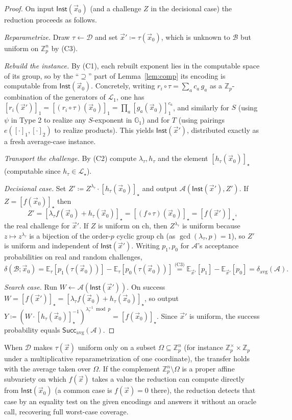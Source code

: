 \documentclass{aicr-solution}
\newcommand{\Gone}{\mathbb{G}_1}
\newcommand{\Zp}{\mathbb{Z}_p}
\newcommand{\Zpx}{\mathbb{Z}_p^{\times}}
\newcommand{\vx}{\vec{x}}
\newcommand{\Inst}{\mathsf{Inst}}
\newcommand{\Succ}{\mathsf{Succ}}
\newcommand{\Ex}{\mathbb{E}}
\newcommand{\LL}{\mathcal{L}}
\newcommand{\ch}{\mathrm{ch}}
\begin{document}
\begin{proof}
On input $\Inst(\vx_0)$ (and a challenge $Z$ in the decisional case) the reduction proceeds
as follows.

\emph{Reparametrize.} Draw $\tau\leftarrow\mathcal D$ and set $\vx'\coloneqq\tau(\vx_0)$,
which is unknown to $\mathcal B$ but uniform on $\Zp^{n}$ by (C3).

\emph{Rebuild the instance.} By (C1), each rebuilt exponent lies in the computable space of
its group, so by the ``$\supseteq$'' part of Lemma~\ref{lem:comp} its encoding is
computable from $\Inst(\vx_0)$. Concretely, writing $r_i\circ\tau=\sum_a c_a\,g_a$ as a
$\Zp$-combination of the generators of $\LL_1$, one has
$[r_i(\vx')]_1=[(r_i\circ\tau)(\vx_0)]_1=\prod_a[g_a(\vx_0)]_1^{c_a}$, and similarly for
$S$ (using $\psi$ in Type 2 to realize any $S$-exponent in $\Gone$) and for $T$ (using
pairings $e([\cdot]_1,[\cdot]_2)$ to realize products). This yields $\Inst(\vx')$,
distributed exactly as a fresh average-case instance.

\emph{Transport the challenge.} By (C2) compute $\lambda_\tau,h_\tau$ and the element
$[h_\tau(\vx_0)]_\star$ (computable since $h_\tau\in\LL_\star$).

\emph{Decisional case.} Set $Z'\coloneqq Z^{\lambda_\tau}\cdot[h_\tau(\vx_0)]_\star$ and
output $\mathcal A(\Inst(\vx'),Z')$. If $Z=[f(\vx_0)]_\star$ then
\[
  Z'=[\lambda_\tau f(\vx_0)+h_\tau(\vx_0)]_\star=[(f\circ\tau)(\vx_0)]_\star=[f(\vx')]_\star,
\]
the real challenge for $\vx'$. If $Z$ is uniform on $\ch$, then $Z^{\lambda_\tau}$ is
uniform because $z\mapsto z^{\lambda_\tau}$ is a bijection of the order-$p$ cyclic group
$\ch$ (as $\gcd(\lambda_\tau,p)=1$), so $Z'$ is uniform and independent of $\Inst(\vx')$.
Writing $p_1,p_0$ for $\mathcal A$'s acceptance probabilities on real and random challenges,
\[
  \delta(\mathcal B;\vx_0)
  =\Ex_{\tau}[p_1(\tau(\vx_0))]-\Ex_{\tau}[p_0(\tau(\vx_0))]
  \overset{\text{(C3)}}{=}\Ex_{\vx'}[p_1]-\Ex_{\vx'}[p_0]
  =\delta_{\mathrm{avg}}(\mathcal A).
\]

\emph{Search case.} Run $W\leftarrow\mathcal A(\Inst(\vx'))$. On success
$W=[f(\vx')]_\star=[\lambda_\tau f(\vx_0)+h_\tau(\vx_0)]_\star$, so output
$Y\coloneqq(W\cdot[h_\tau(\vx_0)]_\star^{-1})^{\lambda_\tau^{-1}\bmod p}=[f(\vx_0)]_\star$.
Since $\vx'$ is uniform, the success probability equals $\Succ_{\mathrm{avg}}(\mathcal A)$.
\end{proof}

\begin{remark}[relaxing (C3)]
\label{rem:c3}
When $\mathcal D$ makes $\tau(\vx)$ uniform only on a subset $\Omega\subseteq\Zp^{n}$ (for
instance $\Zpx\times\Zp$ under a multiplicative reparametrization of one coordinate), the
transfer holds with the average taken over $\Omega$. If the complement $\Zp^{n}\setminus
\Omega$ is a proper affine subvariety on which $f(\vx)$ takes a value the reduction can
compute directly from $\Inst(\vx_0)$ (a common case is $f(\vx)=0$ there), the reduction
detects that case by an equality test on the given encodings and answers it without an
oracle call, recovering full worst-case coverage.
\end{remark}
\end{document}
